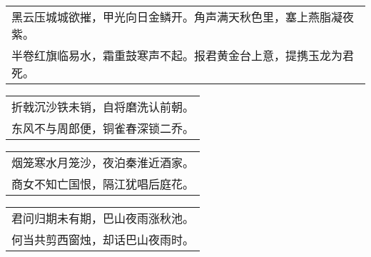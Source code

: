 \noindent\begin{minipage}{\linewidth}
  \vskip-3pt\begin{table}[H]
    \centering
    \begin{tabular}{@{}l@{}}
黑云压城城欲摧，甲光向日金鳞开。角声满天秋色里，塞上燕脂凝夜紫。\\
半卷红旗临易水，霜重鼓寒声不起。报君黄金台上意，提携玉龙为君死。
    \end{tabular}
  \end{table}
\end{minipage}
\vspace{1cm}


\noindent\begin{minipage}{\linewidth}
  \vskip-3pt\begin{table}[H]
    \centering
    \begin{tabular}{@{}l@{}}
折戟沉沙铁未销，自将磨洗认前朝。\\
东风不与周郎便，铜雀春深锁二乔。
    \end{tabular}
  \end{table}
\end{minipage}
\vspace{1cm}


\noindent\begin{minipage}{\linewidth}
  \vskip-3pt\begin{table}[H]
    \centering
    \begin{tabular}{@{}l@{}}
烟笼寒水月笼沙，夜泊秦淮近酒家。\\
商女不知亡国恨，隔江犹唱后庭花。
    \end{tabular}
  \end{table}
\end{minipage}
\vspace{1cm}


\noindent\begin{minipage}{\linewidth}
  \vskip-3pt\begin{table}[H]
    \centering
    \begin{tabular}{@{}l@{}}
君问归期未有期，巴山夜雨涨秋池。\\
何当共剪西窗烛，却话巴山夜雨时。
    \end{tabular}
  \end{table}
\end{minipage}
\vspace{1cm}


